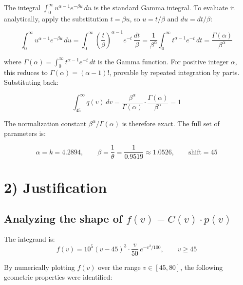 \documentclass{article}
\begin{document}
The integral $\displaystyle\int_{0}^{\infty} u^{\alpha-1} e^{-\beta u}\, du$ is the standard Gamma integral. To evaluate it analytically, apply the substitution $t = \beta u$, so $u = t/\beta$ and $du = dt/\beta$:

\begin{equation}
    \int_{0}^{\infty} u^{\alpha-1} e^{-\beta u}\, du
    = \int_{0}^{\infty} \left(\frac{t}{\beta}\right)^{\alpha-1} e^{-t}\, \frac{dt}{\beta}
    = \frac{1}{\beta^{\alpha}} \int_{0}^{\infty} t^{\alpha-1} e^{-t}\, dt
    = \frac{\Gamma(\alpha)}{\beta^{\alpha}}
\end{equation}

where $\Gamma(\alpha) = \int_{0}^{\infty} t^{\alpha-1} e^{-t}\, dt$ is the Gamma function. For positive integer $\alpha$, this reduces to $\Gamma(\alpha) = (\alpha-1)!$, provable by repeated integration by parts. Substituting back:

\begin{equation}
    \int_{45}^{\infty} q(v)\, dv
    = \frac{\beta^{\alpha}}{\Gamma(\alpha)} \cdot \frac{\Gamma(\alpha)}{\beta^{\alpha}} = 1 
\end{equation}

The normalization constant $\beta^{\alpha}/\Gamma(\alpha)$ is therefore exact. The full set of parameters is:

\begin{equation}
    \boxed{\alpha = k = 4.2894, \qquad \beta = \frac{1}{\theta} = \frac{1}{0.9519} \approx 1.0526, \qquad \text{shift} = 45}
\end{equation}


\newpage

\section*{2) Justification}
\subsection*{Analyzing the shape of $f(v) = C(v) \cdot p(v)$}

The integrand is:
\[
f(v) = 10^5(v-45)^3 \cdot \frac{v}{50}\, e^{-v^2/100}, \qquad v \geq 45
\]

By numerically plotting $f(v)$ over the range $v \in [45, 80]$, the following geometric properties were identified:
\end{document}

